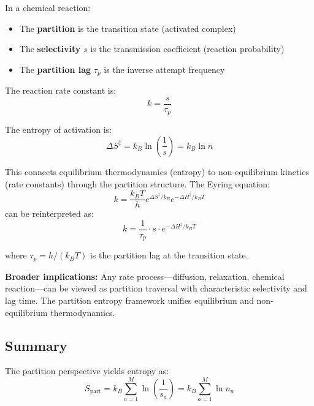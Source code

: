 In a chemical reaction:
\begin{itemize}
\item The \textbf{partition} is the transition state (activated complex)
\item The \textbf{selectivity} $s$ is the transmission coefficient (reaction probability)
\item The \textbf{partition lag} $\tau_p$ is the inverse attempt frequency
\end{itemize}

The reaction rate constant is:
\begin{equation}
k = \frac{s}{\tau_p}
\end{equation}

The entropy of activation is:
\begin{equation}
\Delta S^\ddagger = k_B \ln\left(\frac{1}{s}\right) = k_B \ln n
\end{equation}

This connects equilibrium thermodynamics (entropy) to non-equilibrium kinetics (rate constants) through the partition structure. The Eyring equation:
\begin{equation}
k = \frac{k_B T}{h} e^{\Delta S^\ddagger/k_B} e^{-\Delta H^\ddagger/k_B T}
\end{equation}
can be reinterpreted as:
\begin{equation}
k = \frac{1}{\tau_p} \cdot s \cdot e^{-\Delta H^\ddagger/k_B T}
\end{equation}

where $\tau_p = h/(k_BT)$ is the partition lag at the transition state.

\textbf{Broader implications:} Any rate process—diffusion, relaxation, chemical reaction—can be viewed as partition traversal with characteristic selectivity and lag time. The partition entropy framework unifies equilibrium and non-equilibrium thermodynamics.

\subsection{Summary}

The partition perspective yields entropy as:
\begin{equation}
S_{\text{part}} = k_B \sum_{a=1}^{M} \ln\left(\frac{1}{s_a}\right) = k_B \sum_{a=1}^{M} \ln n_a
\end{equation}

